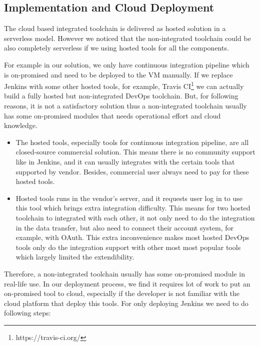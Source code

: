 \subsection{Implementation and Cloud Deployment}
The cloud based integrated toolchain is delivered as hosted solution in a serverless model. However we noticed that the non-integrated toolchain could be also completely serverless if we using hosted tools for all the components. 
\par
For example in our solution, we only have continuous integration pipeline which is on-promised and need to be deployed to the VM manually. If we replace Jenkins with some other hosted tools, for example, Travis CI\footnote{https://travis-ci.org/} we can actually build a fully hosted but non-integrated DevOps toolchain. But, for following reasons, it is not a satisfactory solution thus a non-integrated toolchain usually has some on-promised modules that needs operational effort and cloud knowledge.
\begin{itemize}
 \item The hosted tools, especially tools for continuous integration pipeline, are all closed-source commercial solution. This means there is no community support like in Jenkins, and it can usually integrates with the certain tools that supported by vendor. Besides, commercial user always need to pay for these hosted tools.
 \item Hosted tools runs in the vendor's server, and it requests user log in to use this tool which brings extra integration difficulty. This means for two hosted toolchain to integrated with each other, it not only need to do the integration in the data transfer, but also need to connect their account system, for example, with OAuth. This extra inconvenience makes most hosted DevOps tools only do the integration support with other most most popular tools which largely limited the extendibility.
\end{itemize}
Therefore, a non-integrated toolchain usually has some on-promised module in real-life use. In our deployment process, we find it requires lot of work to put an on-promised tool to cloud, especially if the developer is not familiar with the cloud platform that deploy this tools. For only deploying Jenkins we need to do following steps:
